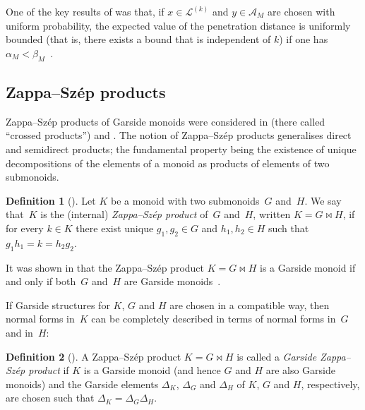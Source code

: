 \documentclass[a4paper,final]{article}
\let\zs=\bowtie
\theoremstyle{plain}
\theoremstyle{remark}
\theoremstyle{definition}
\newtheorem{definition}[definition]{Definition}
\begin{document}
One of the key results of \cite{GT13} was that, if $x\in{\mathcal{L}}^{(k)}$ and $y\in{\mathcal{A}}_M$ are chosen with uniform probability, the expected value of the penetration distance is uniformly bounded (that is, there exists a bound that is independent of $k$) if one has $\alpha_M < \beta_M$~\cite[Theorem 4.7]{GT13}.

\subsection{{Zappa--Sz{\'e}p}{} products}\label{S:BackgroundZappaSzep}

{Zappa--Sz{\'e}p}{} products of Garside monoids were considered in \cite{Picantin01} (there called ``crossed products'') and \cite{Zappa-Szep}.  The notion of {Zappa--Sz{\'e}p}{} products generalises direct and semidirect products; the fundamental property being the existence of unique decompositions of the elements of a monoid as products of elements of two submonoids.

\begin{definition}[{\cite[Definition~1]{Zappa-Szep}}]\label{D:ZappaSzepProduct}
  Let $K$ be a monoid with two submonoids~$G$ and~$H$.  We say that~$K$ is
  the (internal) \emph{{Zappa--Sz{\'e}p}{} product} of~$G$ and~$H$, written
  $K=G\zs H$, if for every $k\in K$ there exist unique $g_1, g_2\in
  G$ and $h_1, h_2 \in H$ such that $g_1 h_1 = k = h_2 g_2$.
\end{definition}

It was shown in \cite{Zappa-Szep} that the {Zappa--Sz{\'e}p}{} product $K=G\zs H$ is a Garside monoid if and only if both~$G$ and~$H$ are Garside monoids~\cite[Theorem~31, Theorem~34]{Zappa-Szep}.

If Garside structures for $K$, $G$ and $H$ are chosen in a compatible way, then normal forms in~$K$ can be completely described in terms of normal forms in~$G$ and in~$H$:

\begin{definition}[{\cite[Definition~37]{Zappa-Szep}}]\label{D:GarsideZappaSzepProduct}
  A {Zappa--Sz{\'e}p}{} product $K=G\zs H$ is called a \emph{Garside {Zappa--Sz{\'e}p}{} product} if $K$ is a Garside monoid (and hence $G$ and $H$ are also Garside monoids) and the Garside elements $\Delta_K$, $\Delta_G$ and $\Delta_H$ of $K$, $G$ and $H$, respectively, are chosen such that
  $\Delta_K = \Delta_G\Delta_H$.
\end{definition}
\end{document}

